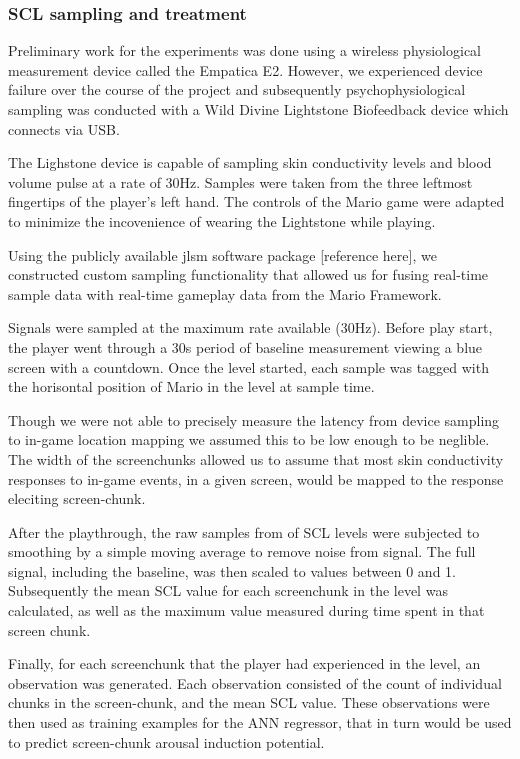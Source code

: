 \documentclass{llncs}
\begin{document}
\subsubsection{SCL sampling and treatment}
Preliminary work for the experiments was done using a wireless physiological measurement device called the Empatica E2.
However, we experienced device failure over the course of the project and subsequently psychophysiological sampling was conducted with a Wild Divine Lightstone Biofeedback device which connects via USB.

The Lighstone device is capable of sampling skin conductivity levels and blood volume pulse at a rate of 30Hz. Samples were taken from the three leftmost fingertips of the player's left hand. The controls of the Mario game were adapted to minimize the incovenience of wearing the Lightstone while playing. 

Using the publicly available jlsm software package [reference here], we constructed  custom sampling functionality that allowed us for fusing real-time sample data with real-time gameplay data from the Mario Framework.

Signals were sampled at the maximum rate available (30Hz). Before play start, the player went through a 30s period of baseline measurement viewing a blue screen with a countdown. Once the level started, each sample was tagged with the horisontal position of Mario in the level at sample time. 

Though we were not able to precisely measure the latency from device sampling to in-game location mapping we assumed this to be low enough to be neglible. The width of the screenchunks allowed us to assume that most skin conductivity responses to in-game events, in a given screen, would be mapped to the response eleciting screen-chunk.

After the playthrough, the raw samples from of SCL levels were subjected to smoothing by a simple moving average to remove noise from signal. The full signal, including the baseline, was then scaled to values between 0 and 1. Subsequently the mean SCL value for each screenchunk in the level was calculated, as well as the maximum value measured during time spent in that screen chunk.

Finally, for each screenchunk that the player had experienced in the level, an observation was generated. Each observation consisted of the count of individual chunks in the screen-chunk, and the mean SCL value. These observations were then used as training examples for the ANN regressor, that in turn would be used to predict screen-chunk arousal induction potential.
\end{document}
